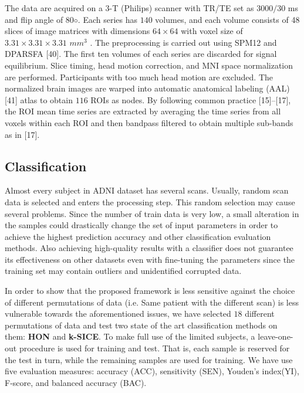 \documentclass[preprint,12pt]{elsarticle}
\begin{document}
	The data are acquired on a $3$-T (Philips) scanner with TR/TE set as $3000/30$
	ms and flip angle of $80◦$. Each series has $140$ volumes, and each volume consists of 48 slices of image matrices with dimensions
	$64 \times 64$
	with voxel size of
	$ 3.31 \times  3.31 \times 3.31$
	$mm^3$ . The preprocessing is carried out using SPM12 and DPARSFA [40]. The
	first ten volumes of each series are discarded for signal equilibrium. Slice timing, head motion correction, and MNI space normalization are performed. Participants with too much head motion are excluded. The normalized brain images are warped into automatic anatomical labeling (AAL) [41] atlas to obtain $116$ ROIs as nodes. By following common practice [15]–[17], the ROI mean time series are extracted by averaging the time series from all voxels within each ROI and then bandpass filtered to obtain multiple sub-bands as in [17]. 
	
	\subsection{Classification}
	
	Almost every subject in ADNI dataset has several scans. Usually, random scan data is selected and enters the processing step\cite{12}. This random selection may cause several problems. Since the number of train data is very low, a small alteration in the samples could drastically change the set of input parameters in order to achieve the highest prediction accuracy and other classification evaluation methods. Also achieving high-quality results with a classifier does not guarantee its effectiveness on other datasets even with fine-tuning the parameters since the training set may contain outliers and unidentified corrupted data.
	
	In order to show that the proposed framework is less sensitive against the choice of different permutations of data (i.e. Same patient with the different scan) is less vulnerable towards the aforementioned issues, we have selected $18$ different permutations of data and test two state of the art classification methods on them: \textbf{HON} and \textbf{k-SICE}.   
	To make full use of the limited subjects, a leave-one-out procedure is used for training and test. That is, each sample is reserved for the test in turn, while the remaining samples are used for training.
	We have use five
	evaluation measures: accuracy (ACC), sensitivity (SEN), Youden’s index(YI), F-score, and balanced accuracy (BAC)\cite{r65}.
	
\end{document}
